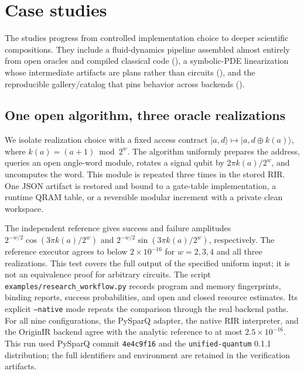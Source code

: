 \section{Case studies}
\label{sec:casestudies}

The studies progress from controlled implementation choice to deeper
scientific compositions. They include a
fluid-dynamics pipeline assembled almost entirely from open oracles and
compiled classical code (), a symbolic-PDE linearization
whose intermediate artifacts are plans rather than circuits
(), and the reproducible gallery/catalog that pins
behavior across backends ().

\subsection{One open algorithm, three oracle realizations}
\label{sec:oracle-study}

We isolate realization choice with a fixed access contract
$|a,d\rangle\mapsto|a,d\oplus k(a)\rangle$, where
$k(a)=(a+1)\bmod 2^w$. The algorithm uniformly prepares the address,
queries an open angle-word module, rotates a signal qubit by
$2\pi k(a)/2^w$, and uncomputes the word. This module is repeated three
times in the stored RIR. One JSON artifact is restored and bound to a
gate-table implementation, a runtime QRAM table, or a reversible modular
increment with a private clean workspace.

The independent reference gives success and failure amplitudes
$2^{-w/2}\cos(3\pi k(a)/2^w)$ and
$2^{-w/2}\sin(3\pi k(a)/2^w)$, respectively.
The reference executor agrees to below $2\times10^{-16}$ for
$w=2,3,4$ and all three realizations. This test covers the full output
of the specified uniform input; it is not an equivalence proof for
arbitrary circuits. The script
\texttt{examples/research\_workflow.py} records program and memory
fingerprints, binding reports, success probabilities, and open and
closed resource estimates. Its explicit \texttt{--native} mode repeats
the comparison through the real backend paths. For all nine configurations,
the PySparQ adapter, the native RIR interpreter, and the OriginIR backend
agree with the analytic reference to at most $2.5\times10^{-16}$.
This run used PySparQ commit \texttt{4e4c9f16} and the
\texttt{unified-quantum} 0.1.1 distribution; the full identifiers and
environment are retained in the verification artifacts.

